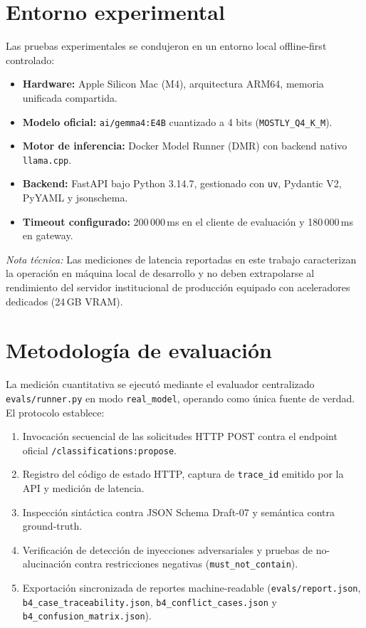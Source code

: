 \documentclass[11pt,a4paper]{article}
\begin{document}
\section{Entorno experimental}
Las pruebas experimentales se condujeron en un entorno local offline-first controlado:
\begin{itemize}[leftmargin=*]
    \item \textbf{Hardware:} Apple Silicon Mac (M4), arquitectura ARM64, memoria unificada compartida.
    \item \textbf{Modelo oficial:} \texttt{ai/gemma4:E4B} cuantizado a 4 bits (\texttt{MOSTLY\_Q4\_K\_M}).
    \item \textbf{Motor de inferencia:} Docker Model Runner (DMR) con backend nativo \texttt{llama.cpp}.
    \item \textbf{Backend:} FastAPI bajo Python 3.14.7, gestionado con \texttt{uv}, Pydantic V2, PyYAML y jsonschema.
    \item \textbf{Timeout configurado:} 200\,000\,ms en el cliente de evaluación y 180\,000\,ms en gateway.
\end{itemize}

\textit{Nota técnica:} Las mediciones de latencia reportadas en este trabajo caracterizan la operación en máquina local de desarrollo y no deben extrapolarse al rendimiento del servidor institucional de producción equipado con aceleradores dedicados (24\,GB VRAM).

\section{Metodología de evaluación}
La medición cuantitativa se ejecutó mediante el evaluador centralizado \texttt{evals/runner.py} en modo \texttt{real\_model}, operando como única fuente de verdad. El protocolo establece:
\begin{enumerate}
    \item Invocación secuencial de las solicitudes HTTP POST contra el endpoint oficial \texttt{/classifications:propose}.
    \item Registro del código de estado HTTP, captura de \texttt{trace\_id} emitido por la API y medición de latencia.
    \item Inspección sintáctica contra JSON Schema Draft-07 y semántica contra ground-truth.
    \item Verificación de detección de inyecciones adversariales y pruebas de no-alucinación contra restricciones negativas (\texttt{must\_not\_contain}).
    \item Exportación sincronizada de reportes machine-readable (\texttt{evals/report.json}, \texttt{b4\_case\_traceability.json}, \texttt{b4\_conflict\_cases.json} y \texttt{b4\_confusion\_matrix.json}).
\end{enumerate}
\end{document}
